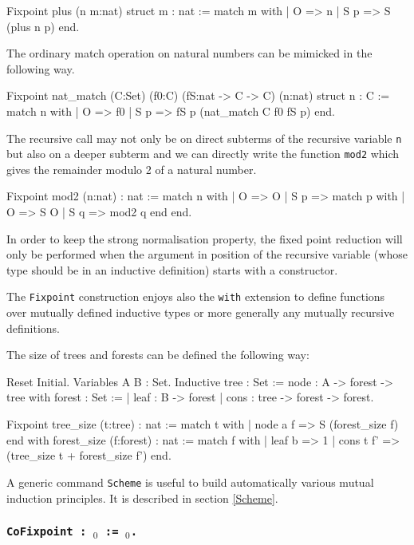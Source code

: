 \begin{coq_example*}
Fixpoint plus (n m:nat) {struct m} : nat :=
  match m with
  | O => n
  | S p => S (plus n p)
  end.
\end{coq_example*}

The ordinary match operation on natural numbers can be mimicked in the
following way.
\begin{coq_example*}
Fixpoint nat_match (C:Set) (f0:C) (fS:nat -> C -> C) (n:nat) {struct n}
 : C := match n with
        | O => f0
        | S p => fS p (nat_match C f0 fS p)
        end.
\end{coq_example*}
The recursive call may not only be on direct subterms of the recursive
variable {\tt n} but also on a deeper subterm and we can directly
write the function {\tt mod2} which gives the remainder modulo 2 of a
natural number.
\begin{coq_example*}
Fixpoint mod2 (n:nat) : nat :=
  match n with
  | O => O
  | S p => match p with
           | O => S O
           | S q => mod2 q
           end
  end.
\end{coq_example*}
In order to keep the strong normalisation property, the fixed point
reduction will only be performed when the argument in position of the
recursive variable (whose type should be in an inductive definition)
starts with a constructor.

The {\tt Fixpoint} construction enjoys also the {\tt with} extension
to define functions over mutually defined inductive types or more
generally any mutually recursive definitions.

\Example 
The size of trees and forests can be defined the following way: 
\begin{coq_eval}
Reset Initial.
Variables A B : Set.
Inductive tree : Set :=
    node : A -> forest -> tree
with forest : Set :=
  | leaf : B -> forest
  | cons : tree -> forest -> forest.
\end{coq_eval}
\begin{coq_example*}
Fixpoint tree_size (t:tree) : nat :=
  match t with
  | node a f => S (forest_size f)
  end
 with forest_size (f:forest) : nat :=
  match f with
  | leaf b => 1%
  | cons t f' => (tree_size t + forest_size f')%
  end.
\end{coq_example*}
A generic command {\tt Scheme} is useful to build automatically various
mutual induction principles. It is described in section \ref{Scheme}.

\subsubsection{\tt CoFixpoint {\ident} :
\type$_0$ := \term$_0$.}\label{CoFixpoint}

